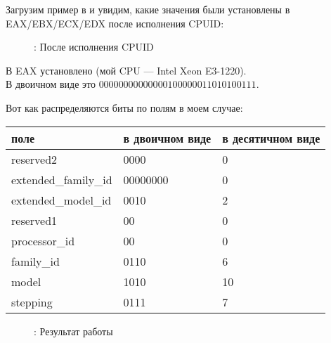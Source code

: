 ﻿\clearpage
{}
\myindex{\olly}

Загрузим пример в \olly и увидим, какие значения были установлены в EAX/EBX/ECX/EDX после исполнения CPUID: 

\begin{figure}[H]
\centering
{}
\caption{\olly: После исполнения CPUID}
\label{fig:cpuid_olly_1}
\end{figure}

В EAX установлено  (мой \ac{CPU} --- Intel Xeon E3-1220).\\
В двоичном виде это $0000 0000 0000 0010 0000 0110 1010 0111$.

Вот как распределяются биты по полям в моем случае:

\begin{center}
\begin{tabular}{ | l | l | l | }
\hline
\headercolor{} поле &
\headercolor{} в двоичном виде &
\headercolor{} в десятичном виде \\
\hline
reserved2		& 0000 & 0 \\
\hline
extended\_family\_id	& 00000000 & 0 \\
\hline
extended\_model\_id	& 0010 & 2 \\
\hline
reserved1		& 00 & 0 \\
\hline
processor\_id		& 00 & 0 \\
\hline
family\_id		& 0110 & 6 \\
\hline
model			& 1010 & 10 \\
\hline
stepping		& 0111 & 7 \\
\hline
\end{tabular}
\end{center}

\begin{figure}[H]
\centering
{}
\caption{\olly: Результат работы}
\label{fig:cpuid_olly_2}
\end{figure}

